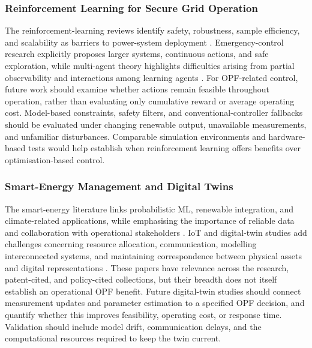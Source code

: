 \documentclass[a4paper,fleqn]{cas-sc}
\begin{document}
    \subsubsection{Reinforcement Learning for Secure Grid Operation}\label{subsubsec:gaps_reinforcement}
    
    The reinforcement-learning reviews identify safety, robustness, sample efficiency, and scalability as barriers to power-system deployment \cite{opfRef073,chen2022reinforcement}. Emergency-control research explicitly proposes larger systems, continuous actions, and safe exploration, while multi-agent theory highlights difficulties arising from partial observability and interactions among learning agents \cite{opfRef064,opfRef085}. For OPF-related control, future work should examine whether actions remain feasible throughout operation, rather than evaluating only cumulative reward or average operating cost. Model-based constraints, safety filters, and conventional-controller fallbacks should be evaluated under changing renewable output, unavailable measurements, and unfamiliar disturbances. Comparable simulation environments and hardware-based tests would help establish when reinforcement learning offers benefits over optimisation-based control.
    
    \subsubsection{Smart-Energy Management and Digital Twins}\label{subsubsec:gaps_digital_twins}
    
    The smart-energy literature links probabilistic ML, renewable integration, and climate-related applications, while emphasising the importance of reliable data and collaboration with operational stakeholders \cite{ahmad2022data,opfRef084,rolnick2022tackling}. IoT and digital-twin studies add challenges concerning resource allocation, communication, modelling interconnected systems, and maintaining correspondence between physical assets and digital representations \cite{opfRef032,opfRef089,thelen2022comprehensive}. These papers have relevance across the research, patent-cited, and policy-cited collections, but their breadth does not itself establish an operational OPF benefit. Future digital-twin studies should connect measurement updates and parameter estimation to a specified OPF decision, and quantify whether this improves feasibility, operating cost, or response time. Validation should include model drift, communication delays, and the computational resources required to keep the twin current.
    
\end{document}
